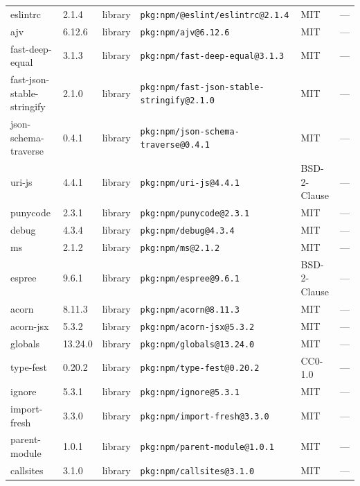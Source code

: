 \documentclass[11pt,a4paper]{article}
\begin{document}
\begin{longtable}{|p{4cm}|p{2cm}|p{1.6cm}|p{5cm}|p{1.5cm}|p{3.5cm}|}
\raggedright eslintrc & 2.1.4 & library & \small\texttt{pkg:npm/@eslint/eslintrc@2.1.4} & MIT & \small — \\
\raggedright ajv & 6.12.6 & library & \small\texttt{pkg:npm/ajv@6.12.6} & MIT & \small — \\
\raggedright fast-deep-equal & 3.1.3 & library & \small\texttt{pkg:npm/fast-deep-equal@3.1.3} & MIT & \small — \\
\raggedright fast-json-stable-stringify & 2.1.0 & library & \small\texttt{pkg:npm/fast-json-stable-stringify@2.1.0} & MIT & \small — \\
\raggedright json-schema-traverse & 0.4.1 & library & \small\texttt{pkg:npm/json-schema-traverse@0.4.1} & MIT & \small — \\
\raggedright uri-js & 4.4.1 & library & \small\texttt{pkg:npm/uri-js@4.4.1} & BSD-2-Clause & \small — \\
\raggedright punycode & 2.3.1 & library & \small\texttt{pkg:npm/punycode@2.3.1} & MIT & \small — \\
\raggedright debug & 4.3.4 & library & \small\texttt{pkg:npm/debug@4.3.4} & MIT & \small — \\
\raggedright ms & 2.1.2 & library & \small\texttt{pkg:npm/ms@2.1.2} & MIT & \small — \\
\raggedright espree & 9.6.1 & library & \small\texttt{pkg:npm/espree@9.6.1} & BSD-2-Clause & \small — \\
\raggedright acorn & 8.11.3 & library & \small\texttt{pkg:npm/acorn@8.11.3} & MIT & \small — \\
\raggedright acorn-jsx & 5.3.2 & library & \small\texttt{pkg:npm/acorn-jsx@5.3.2} & MIT & \small — \\
\raggedright globals & 13.24.0 & library & \small\texttt{pkg:npm/globals@13.24.0} & MIT & \small — \\
\raggedright type-fest & 0.20.2 & library & \small\texttt{pkg:npm/type-fest@0.20.2} & CC0-1.0 & \small — \\
\raggedright ignore & 5.3.1 & library & \small\texttt{pkg:npm/ignore@5.3.1} & MIT & \small — \\
\raggedright import-fresh & 3.3.0 & library & \small\texttt{pkg:npm/import-fresh@3.3.0} & MIT & \small — \\
\raggedright parent-module & 1.0.1 & library & \small\texttt{pkg:npm/parent-module@1.0.1} & MIT & \small — \\
\raggedright callsites & 3.1.0 & library & \small\texttt{pkg:npm/callsites@3.1.0} & MIT & \small — \\

\end{longtable}
\end{document}
